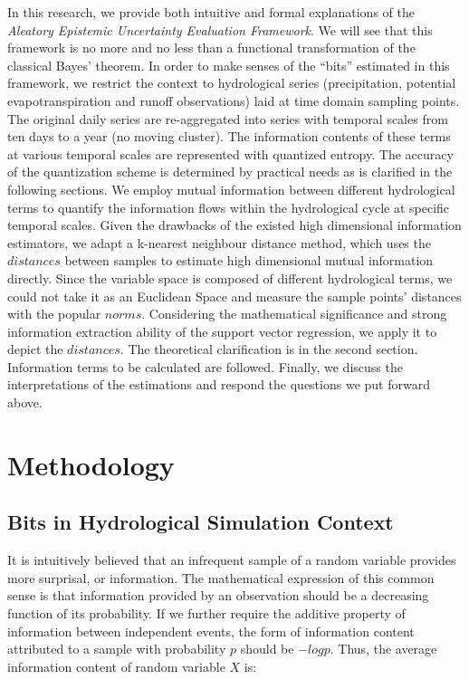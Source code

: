 \documentclass[draft,wrr]{AGUTeX}
\begin{document}
\begin{article}
In this research, we provide both intuitive and formal explanations of the \emph{Aleatory Epistemic Uncertainty Evaluation Framework}. We will see that this framework is no more and no less than a  functional transformation of the classical Bayes' theorem. In order to make senses of the ``bits'' estimated in this framework, we restrict the context to hydrological series (precipitation, potential evapotranspiration and runoff observations) laid at time domain sampling points. The original daily series are re-aggregated into series with temporal scales from ten days to a year (no moving cluster). The information contents of these terms at various temporal scales are represented with quantized entropy. The accuracy of the quantization scheme is determined by practical needs as is clarified in the following sections. We employ mutual information between different hydrological terms to quantify the information flows within the hydrological cycle at specific temporal scales. Given the drawbacks of the existed high dimensional information estimators, we adapt a k-nearest neighbour distance method\citep{kraskov2004estimating}, which uses the $distances$ between samples to estimate high dimensional mutual information directly. Since the variable space is composed of different hydrological terms, we could not take it as an Euclidean Space and measure the sample points' distances with the popular $norms$. Considering the mathematical significance and strong information extraction ability of the support vector regression\citep{cortes1995support}, we apply it to depict the $distances$. The theoretical clarification is in the second section. Information terms to be calculated are followed. Finally, we discuss the interpretations of the estimations and respond the questions we put forward above.





\section{Methodology}
\subsection{Bits in Hydrological Simulation Context}

It is intuitively believed that an infrequent sample of a random variable provides more surprisal, or information. The  mathematical expression of this common sense is that information provided by an observation should be a decreasing function of its probability. If we further require the additive property of information between independent events, the form of information content attributed to a sample with probability $p$ should be $-logp$. Thus, the average information content of random variable $X$ is:


\end{article}
\end{document}
